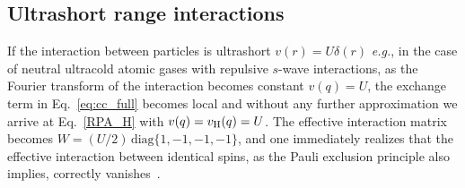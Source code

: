 \documentclass[aps, pra, reprint,superscriptaddress]{revtex4-1}
\begin{document}
\subsection{Ultrashort range interactions\label{sec:shortrange}}
If the interaction between particles is ultrashort $v(r)=U\delta(r)$ \textit{e.g.}, in the case of neutral ultracold atomic gases with repulsive $s$-wave interactions, as the Fourier transform of the interaction becomes constant $v(q)=U$, the exchange term in Eq.~\eqref{eq:cc_full} becomes local and without any further approximation we arrive at Eq.~\eqref{RPA_H} with $v(q)=v_{\rm H}(q)=U$. 
The effective interaction matrix becomes $W=(U/2)\, \textrm{diag}\{1,-1,-1,-1\}$, and one immediately realizes that the effective interaction between identical spins, as the Pauli exclusion principle also implies, correctly vanishes~\cite{Zhang_pra2013}. 

\end{document}
